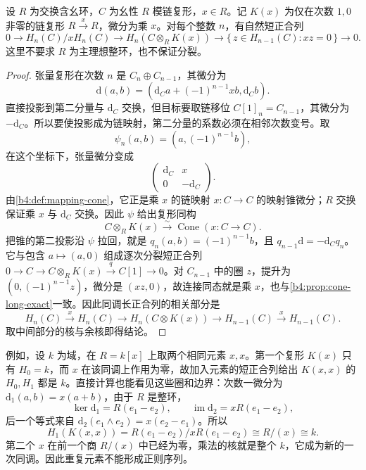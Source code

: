 \begin{proposition}\label{b4:prop:koszul-adjoin-element}
	设 \(R\) 为交换含幺环，\(C\) 为幺性 \(R\) 模链复形，\(x\in R\)。记 \(K(x)\) 为仅在次数 \(1,0\) 非零的链复形 \(R\xrightarrow{x}R\)，微分为乘 \(x\)。对每个整数 \(n\)，有自然短正合列
	\[
		0\longrightarrow H_n(C)/xH_n(C) \longrightarrow H_n(C\otimes_R K(x)) \longrightarrow\{\,z\in H_{n-1}(C):xz=0\,\} \longrightarrow0.
	\]
	这里不要求 \(R\) 为主理想整环，也不保证分裂。
\end{proposition}
\begin{proof}
	张量复形在次数 \(n\) 是 \(C_n\oplus C_{n-1}\)，其微分为
	\[
		\mathrm{d}(a,b)=(\mathrm{d}_Ca+(-1)^{n-1}xb,\mathrm{d}_Cb).
	\]
	直接投影到第二分量与 \(\mathrm{d}_C\) 交换，但目标要取链移位 \(C[1]_n=C_{n-1}\)，其微分为 \(-\mathrm{d}_C\)。所以要使投影成为链映射，第二分量的系数必须在相邻次数变号。取
	\[
		\psi_n(a,b)=(a,(-1)^{n-1}b),
	\]
	在这个坐标下，张量微分变成
	\[
		\begin{pmatrix}\mathrm{d}_C&x\\0&-\mathrm{d}_C\end{pmatrix}.
	\]
	由\cref{b4:def:mapping-cone}，它正是乘 \(x\) 的链映射 \(x:C\to C\) 的映射锥微分；\(R\) 交换保证乘 \(x\) 与 \(\mathrm{d}_C\) 交换。因此 \(\psi\) 给出复形同构
	\[
		C\otimes_RK(x)\xrightarrow{\sim}\operatorname{Cone}(x:C\to C).
	\]
	把锥的第二投影沿 \(\psi\) 拉回，就是 \(q_n(a,b)=(-1)^{n-1}b\)，且 \(q_{n-1}\mathrm{d}=-\mathrm{d}_Cq_n\)。它与包含 \(a\mapsto(a,0)\) 组成逐次分裂短正合列 \(0\to C\to C\otimes_RK(x)\xrightarrow{q}C[1]\to0\)。对 \(C_{n-1}\) 中的圈 \(z\)，提升为 \((0,(-1)^{n-1}z)\)，微分是 \((xz,0)\)，故连接同态就是乘 \(x\)，也与\cref{b4:prop:cone-long-exact}一致。因此同调长正合列的相关部分是
	\[
		H_n(C)\xrightarrow{x}H_n(C)\longrightarrow H_n(C\otimes K(x)) \longrightarrow H_{n-1}(C)\xrightarrow{x}H_{n-1}(C).
	\]
	取中间部分的核与余核即得结论。
\end{proof}

例如，设 \(k\) 为域，在 \(R=k[x]\) 上取两个相同元素 \(x,x\)。第一个复形 \(K(x)\) 只有 \(H_0=k\)，而 \(x\) 在该同调上作用为零，故加入元素的短正合列给出 \(K(x,x)\) 的 \(H_0,H_1\) 都是 \(k\)。直接计算也能看见这些圈和边界：次数一微分为 \(\mathrm{d}_1(a,b)=x(a+b)\)，由于 \(R\) 是整环，
\[
	\ker\mathrm{d}_1=R(e_1-e_2),\qquad \operatorname{im}\mathrm{d}_2=xR(e_1-e_2),
\]
后一个等式来自 \(\mathrm{d}_2(e_1\wedge e_2)=x(e_2-e_1)\)。所以
\[
	H_1(K(x,x))=R(e_1-e_2)/xR(e_1-e_2)\cong R/(x)\cong k.
\]
第二个 \(x\) 在前一个商 \(R/(x)\) 中已经为零，乘法的核就是整个 \(k\)，它成为新的一次同调。因此重复元素不能形成正则序列。
